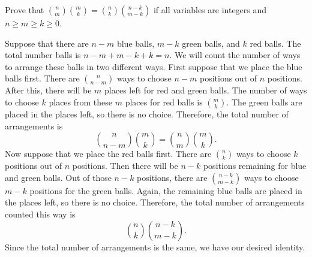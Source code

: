 \begin{question}
    Prove that $\binom{n}{m}\binom{m}{k} = \binom{n}{k}\binom{n - k}{m - k}$ if
    all variables are integers and $n \geq m \geq k \geq 0$.
\end{question}
\begin{solution}
    Suppose that there are $n - m$ blue balls, $m - k$ green balls, and $k$ red
    balls. The total number balls is $n - m + m - k + k = n$. We will count the
    number of ways to arrange these balls in two different ways. First suppose
    that we place the blue balls first. There are $\binom{n}{n - m}$ ways to
    choose $n - m$ positions out of $n$ positions. After this, there will be
    $m$ places left for red and green balls. The number of ways to choose $k$
    places from these $m$ places for red balls is $\binom{m}{k}$. The green
    balls are placed in the places left, so there is no choice. Therefore,
    the total number of arrangements is
    \[ \binom{n}{n - m}\binom{m}{k} = \binom{n}{m}\binom{m}{k}. \]
    Now suppose that we place the red balls first. There are $\binom{n}{k}$
    ways to choose $k$ positions out of $n$ positions. Then there will be $n -
    k$ positions remaining for blue and green balls. Out of those $n - k$
    positions, there are $\binom{n - k}{m - k}$ ways to choose $m - k$
    positions for the green balls. Again, the remaining blue balls are placed in
    the places left, so there is no choice. Therefore, the total number of
    arrangements counted this way is
    \[ \binom{n}{k}\binom{n - k}{m - k}. \]
    Since the total number of arrangements is the same, we have our desired
    identity.
\end{solution}

